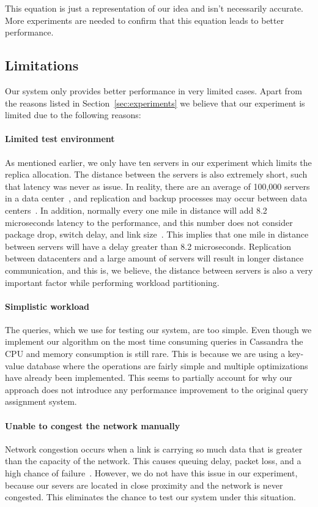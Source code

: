 This equation is just a representation of our idea and isn't necessarily accurate. More experiments are needed to confirm that this equation leads to better performance. 

\subsection{Limitations}
Our system only provides better performance in very limited cases. Apart from the reasons listed in Section~\ref{sec:experiments} we believe that our experiment is limited due to the following reasons:

\paragraph{Limited test environment}
As mentioned earlier, we only have ten servers in our experiment which limits the replica allocation. The distance between the servers is also extremely short, such that latency was never as issue. In reality, there are an average of 100,000 servers in a data center~\cite{Guo:2010:SDC:1921168.1921188}, and replication and backup processes may occur between data centers~\cite{F5-Accelerate}. In addition, normally every one mile in distance will add 8.2 microseconds latency to the performance, and this number does not consider package drop, switch delay, and link size~\cite{Cisco-Latency}. This implies that one mile in distance between servers will have a delay greater than 8.2 microseconds. Replication between datacenters and a large amount of servers will result in longer distance communication, and this is, we believe, the distance between servers is also a very important factor while performing workload partitioning.
 
\paragraph{Simplistic workload}
The queries, which we use for testing our system, are too simple. Even though we implement our algorithm on the most time consuming queries in Cassandra the CPU and memory consumption is still rare. This is because we are using a key-value database where the operations are fairly simple and multiple optimizations have already been implemented. This seems to partially account for why our approach does not introduce any performance improvement to the original query assignment system.
 
\paragraph{Unable to congest the network manually}
Network congestion occurs when a link is carrying so much data that is greater than the capacity of the network. This causes queuing delay, packet loss, and a high chance of failure~\cite{103559}. However, we do not have this issue in our experiment, because our severs are located in close proximity and the network is never congested. This eliminates the chance to test our system under this situation.
 
